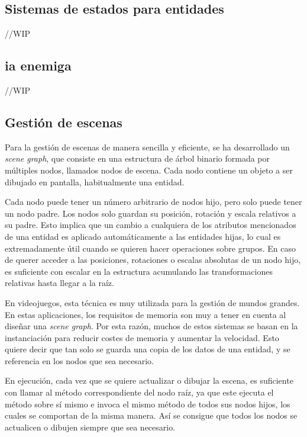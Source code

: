 	\subsection{Sistemas de estados para entidades}

		//WIP

	\subsection{\acrshort{ia} enemiga}

		//WIP

	\subsection{Gestión de escenas}

		Para la gestión de escenas de manera sencilla y eficiente, se ha desarrollado un \textit{scene graph}, que consiste en una estructura de árbol binario formada por múltiples nodos, llamados nodos de escena. Cada nodo contiene un objeto a ser dibujado en pantalla, habitualmente una entidad.

		Cada nodo puede tener un número arbitrario de nodos hijo, pero solo puede tener un nodo padre. Los nodos solo guardan su posición, rotación y escala relativos a su padre. Esto implica que un cambio a cualquiera de los atributos mencionados de una entidad es aplicado automáticamente a las entidades hijas, lo cual es extremadamente útil cuando se quieren hacer operaciones sobre grupos. En caso de querer acceder a las posiciones, rotaciones o escalas absolutas de un nodo hijo, es suficiente con escalar en la estructura acumulando las transformaciones relativas hasta llegar a la raíz.

		En videojuegos, esta técnica es muy utilizada para la gestión de mundos grandes. En estas aplicaciones, los requisitos de memoria son muy a tener en cuenta al diseñar una \textit{scene graph}. Por esta razón, muchos de estos sistemas se basan en la instanciación para reducir costes de memoria y aumentar la velocidad. Esto quiere decir que tan solo se guarda una copia de los datos de una entidad, y se referencia en los nodos que sea necesario.

		En ejecución, cada vez que se quiere actualizar o dibujar la escena, es suficiente con llamar al método correspondiente del nodo raíz, ya que este ejecuta el método sobre sí mismo e invoca el mismo método de todos sus nodos hijos, los cuales se comportan de la misma manera. Así se consigue que todos los nodos se actualicen o dibujen siempre que sea necesario.

